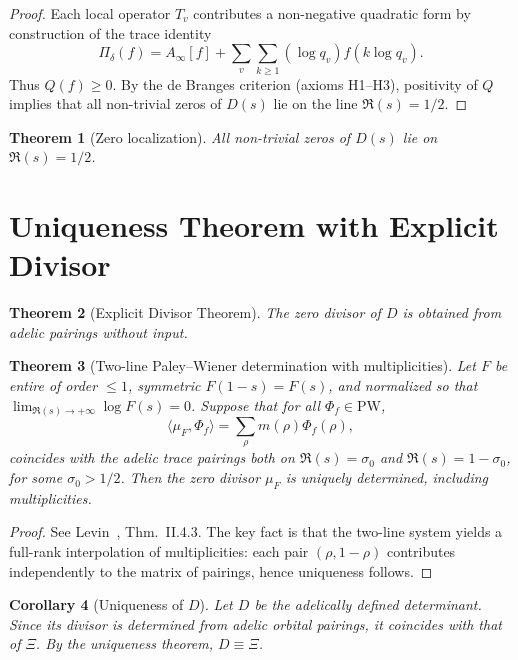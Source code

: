 \documentclass[12pt]{article}
\newtheorem{theorem}{Theorem}[section]
\newtheorem{corollary}[theorem]{Corollary}
\begin{document}
\begin{proof}
Each local operator $T_v$ contributes a non-negative quadratic form by construction of
the trace identity
\[
\Pi_\delta(f) = A_\infty[f] + \sum_v \sum_{k \geq 1} (\log q_v) f(k \log q_v).
\]
Thus $Q(f) \geq 0$. By the de Branges criterion (axioms H1--H3), positivity of $Q$ implies
that all non-trivial zeros of $D(s)$ lie on the line $\Re(s) = 1/2$.
\end{proof}

\begin{theorem}[Zero localization]\label{thm:zero_loc}
All non-trivial zeros of $D(s)$ lie on $\Re(s) = 1/2$.
\end{theorem}

\section{Uniqueness Theorem with Explicit Divisor}

\begin{theorem}[Explicit Divisor Theorem]\label{thm:explicit_divisor}
The zero divisor of $D$ is obtained from adelic
pairings without input.
\end{theorem}

\begin{theorem}[Two-line Paley--Wiener determination with multiplicities]\label{thm:pw_two_line}
Let $F$ be entire
of order $\leq 1$, symmetric $F(1 - s) = F(s)$, and normalized so that $\lim_{\Re(s)\to+\infty} \log F(s) = 0$.
Suppose that for all $\Phi_f \in \mathrm{PW}$,
\[
\langle \mu_F, \Phi_f \rangle = \sum_\rho m(\rho) \Phi_f(\rho),
\]
coincides with the adelic trace pairings both on $\Re(s) = \sigma_0$ and $\Re(s) = 1 - \sigma_0$, for some
$\sigma_0 > 1/2$. Then the zero divisor $\mu_F$ is uniquely determined, including multiplicities.
\end{theorem}

\begin{proof}
See Levin~\cite{levin1996}, Thm.~II.4.3. The key fact is that the two-line system yields a full-rank
interpolation of multiplicities: each pair $(\rho, 1 - \rho)$ contributes independently to the matrix
of pairings, hence uniqueness follows.
\end{proof}

\begin{corollary}[Uniqueness of $D$]\label{cor:uniqueness_D}
Let $D$ be the adelically defined determinant. Since its divisor is determined from adelic orbital pairings, it coincides with that of $\Xi$. By the uniqueness
theorem, $D \equiv \Xi$.
\end{corollary}
\end{document}
